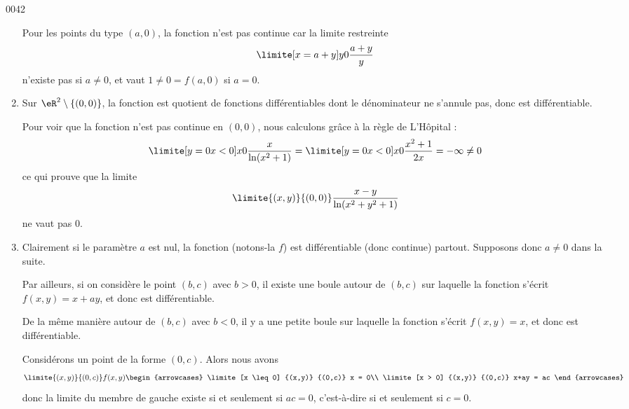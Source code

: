 \begin{corrige}{0042}
\begin{enumerate}
  Pour les points du type $(a,0)$, la fonction n'est pas continue car
  la limite restreinte
  \begin{equation*}
    \limite[x = a + y] y 0 \frac{a+y}{y}
  \end{equation*}
  n'existe pas si $a \neq 0$, et vaut $1 \neq 0 = f(a,0)$ si $a = 0$.

\item Sur $\eR^2\setminus\{(0,0)\}$, la fonction est quotient de
  fonctions différentiables dont le dénominateur ne s'annule pas, donc
  est différentiable.

Pour voir que la fonction n'est pas continue en $(0,0)$, nous
calculons grâce à la règle de L'Hôpital :
\begin{equation*}
  \limite[y = 0\\x < 0] x 0 \frac{x}{\ln(x^2+1)} =   \limite[y = 0\\x <
  0] x 0 \frac{x^2+1}{2x} = -\infty \neq 0
\end{equation*}
ce qui prouve que la limite
\begin{equation*}
  \limite {(x,y)} {(0,0)} \frac{x-y}{\ln(x^2+y^2+1)}
\end{equation*}
ne vaut pas $0$.

\item Clairement si le paramètre $a$ est nul, la fonction (notons-la
  $f$) est différentiable (donc continue) partout. Supposons donc $a
  \neq 0$ dans la suite.

  Par ailleurs, si on considère le point $(b,c)$ avec $b > 0$, il
  existe une boule autour de $(b,c)$ sur laquelle la fonction s'écrit
  $f(x,y) = x + a y$, et donc est différentiable.

  De la même manière autour de $(b,c)$ avec $b < 0$, il y a une petite
  boule sur laquelle la fonction s'écrit $f(x,y) = x$, et donc est
  différentiable.

   Considérons un point de la forme $(0,c)$. Alors nous avons
   \begin{equation*}
     \limite{(x,y)} {(0,c)} f(x,y)   \begin{arrowcases}
       \limite[x \leq 0] {(x,y)} {(0,c)} x = 0\\
       \limite[x > 0] {(x,y)} {(0,c)} x+ay = ac
     \end{arrowcases}
   \end{equation*}
   donc la limite du membre de gauche existe si et seulement si $ac =
   0$, c'est-à-dire si et seulement si $c = 0$.


\end{enumerate}
\end{corrige}
